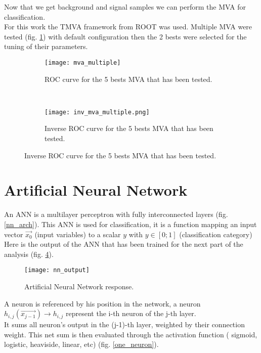 \label{sec:unchapitre}

Now that we get background and signal samples we can perform the MVA for classification.\\
For this work the TMVA framework from ROOT was used. Multiple MVA were tested (fig. \ref{mva_multiple}) with default configuration then the 2
bests were selected for the tuning of their parameters.\\

\begin{figure}[h!]
\centering
    \begin{subfigure}[h!]{0.4\textwidth}
    \centering
        \texttt{[image: mva\_multiple]}
        \caption{ROC curve for the 5 bests MVA that has been tested.}
        \label{mva_multiple}
  \end{subfigure}
  ~
    \begin{subfigure}[h!]{0.4\textwidth}
    \centering
        \texttt{[image: inv\_mva\_multiple.png]}
        \caption{Inverse ROC curve for the 5 bests MVA that has been tested.}
        \label{inv_mva_multiple}
  \end{subfigure}
\end{figure}


\section{Artificial Neural Network}

An ANN is a multilayer perceptron with fully interconnected layers (fig. \ref{nn_arch}).
This ANN is used for classification, it is a function mapping an input vector $\vec{x_0}$ (input variables) to a scalar $y$ with $y \in [0;1]$ (classification category)\\
Here is the output of the ANN that has been trained for the next part of the analysis (fig. \ref{nn_output}).
\begin{figure}[h!]
\centering
    \texttt{[image: nn\_output]}
    \caption{Artificial Neural Network response.}
    \label{nn_output}
\end{figure}



A neuron is referenced by his position in the network, a neuron $h_{i,j}(\vec{x_{j-1}}) \rightarrow h_{i,j}$ represent the i-th neuron of the j-th layer.\\
It sums all neuron's output in the (j-1)-th layer, weighted by their connection weight. This net sum is then evaluated through the activation function ( sigmoid, logistic, heaviside, linear, etc) (fig. \ref{one_neuron}).

